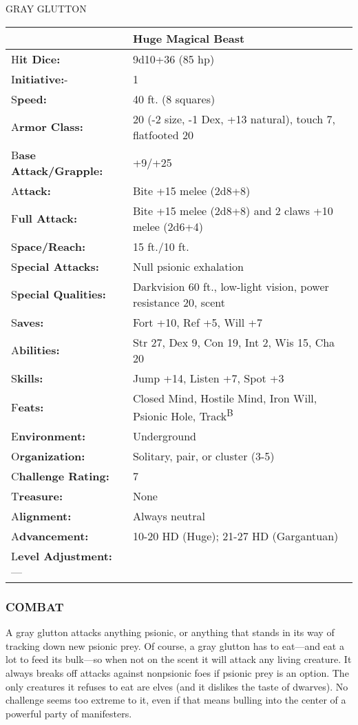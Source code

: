 \documentclass{article}
\begin{document}
\vspace{12pt}
{\LARGE{}GRAY GLUTTON}

\begin{tabular}{|>{\raggedright}p{89pt}|>{\raggedright}p{237pt}|}
\hline
  & Huge Magical Beast\tabularnewline
\hline
H\textbf{it Dice:} & 9d10+36 (85 hp)\tabularnewline
\hline
I\textbf{nitiative:}- & 1\tabularnewline
\hline
S\textbf{peed:} & 40 ft. (8 squares)\tabularnewline
\hline
A\textbf{rmor Class:} & 20 (-2 size, -1 Dex, +13 natural), touch 7, flatfooted 
20\tabularnewline
\hline
B\textbf{ase Attack/Grapple:} & +9/+25\tabularnewline
\hline
A\textbf{ttack:} & Bite +15 melee (2d8+8)\tabularnewline
\hline
F\textbf{ull Attack:} & Bite +15 melee (2d8+8) and 2 claws +10 melee (2d6+4)\tabularnewline
\hline
S\textbf{pace/Reach:} & 15 ft./10 ft.\tabularnewline
\hline
S\textbf{pecial Attacks:} & Null psionic exhalation\tabularnewline
\hline
S\textbf{pecial Qualities:} & Darkvision 60 ft., low-light vision, power resistance 
20, scent\tabularnewline
\hline
S\textbf{aves:} & Fort +10, Ref +5, Will +7\tabularnewline
\hline
A\textbf{bilities:} & Str 27, Dex 9, Con 19, Int 2, Wis 15, Cha 20\tabularnewline
\hline
S\textbf{kills:} & Jump +14, Listen +7, Spot +3\tabularnewline
\hline
F\textbf{eats:} & Closed Mind, Hostile Mind, Iron Will, Psionic Hole, Track\textsuperscript{B}\tabularnewline
\hline
E\textbf{nvironment:} & Underground\tabularnewline
\hline
O\textbf{rganization:} & Solitary, pair, or cluster (3-5)\tabularnewline
\hline
C\textbf{hallenge Rating:} & 7\tabularnewline
\hline
T\textbf{reasure:} & None\tabularnewline
\hline
A\textbf{lignment:} & Always neutral\tabularnewline
\hline
A\textbf{dvancement:} & 10-20 HD (Huge); 21-27 HD (Gargantuan)\tabularnewline
\hline
L\textbf{evel Adjustment:}--- & \tabularnewline
\hline
\end{tabular}

\subsubsection*{COMBAT }

A gray glutton attacks anything psionic, or anything that stands in its way of 
tracking down new psionic prey. Of course, a gray glutton has to eat---and eat 
a lot to feed its bulk---so when not on the scent it will attack any living creature. 
It always breaks off attacks against nonpsionic foes if psionic prey is an option. 
The only creatures it refuses to eat are elves (and it dislikes the taste of dwarves). 
No challenge seems too extreme to it, even if that means bulling into the center 
of a powerful party of manifesters.
\end{document}
